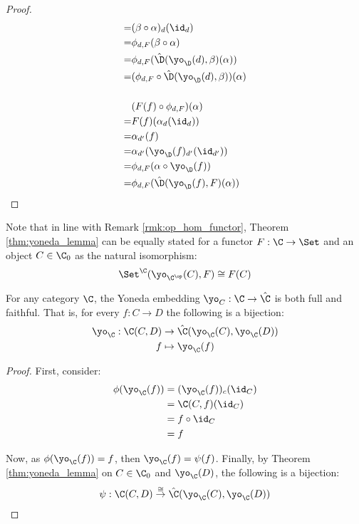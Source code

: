 \begin{theorem}
\begin{proof}
\[\begin{aligned}
        =& (\beta \circ \alpha)_d (\id_d)\\
        =& \phi_{d, F}(\beta \circ \alpha)\\
        =& \phi_{d, F}(\hat{\D}(\yo_\D(d), \beta)(\alpha))\\
        =& (\phi_{d, F} \circ \hat{\D}(\yo_\D(d), \beta)) (\alpha)\\
        \\
        &(F(f)\circ \phi_{d, F}) (\alpha)\\
        =& F(f)(\alpha_d (\id_d))\\
        =& \alpha_{d'}(f)\\
        =& \alpha_{d'}(\yo_\D(f)_{d'}(\id_{d'}))\\
        =& \phi_{d, F}(\alpha \circ \yo_\D(f))\\
        =& \phi_{d, F}(\hat{\D}(\yo_\D(f), F)(\alpha))
      \end{aligned}
    \]
  \end{proof}
  \vspace{-1.5\baselineskip}
\end{theorem}

\begin{remark}
  Note that in line with Remark \ref{rmk:op_hom_functor}, Theorem
  \ref{thm:yoneda_lemma} can be equally stated for a functor $F:\C \to \Set$ and
  an object $C\in\C_0$ as the natural isomorphism:
  \[\Set^{\C}(\yo_{\C^\op}(C), F) \cong F(C)\]
\end{remark}

\begin{theorem}\label{thm:yoneda_full_faithful} For
  any category $\C$, the Yoneda embedding $\yo_C: \C \to \hat{\C}$ is both full
  and faithful. That is, for every $f: C\to D$ the following is a bijection:
  \[
    \begin{aligned}
      \yo_\C: \C(C, D) &\to \hat{\C}(\yo_\C(C), \yo_\C(D))\\
      f &\mapsto \yo_\C(f)
    \end{aligned}
  \]

  \begin{proof}
    First, consider:
    \[
      \begin{aligned}
        \phi(\yo_\C(f))
        &= (\yo_\C(f))_c(\id_C)\\
        &= \C(C, f) (\id_C)\\
        &= f \circ \id_C\\
        &= f
      \end{aligned}
    \]

    Now, as $\phi(\yo_\C(f)) = f$, then $\yo_\C(f) = \psi(f)$. Finally, by
    Theorem \ref{thm:yoneda_lemma} on $C\in\C_0$ and $\yo_\C(D)$, the following
    is a bijection:
    \[\psi: \C(C,D) \overset{\cong}{\to} \hat{\C}(\yo_\C(C), \yo_\C(D))\]
  \end{proof}
  \vspace{-\baselineskip}
\end{theorem}


